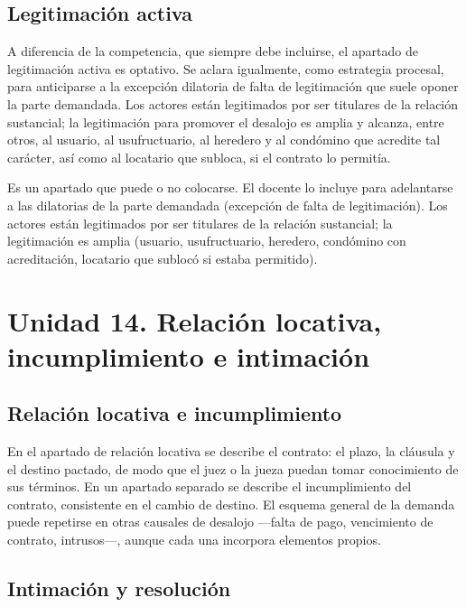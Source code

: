 \documentclass[12pt,oneside]{book}
\begin{document}
\subsection*{Legitimación activa}

A diferencia de la competencia, que siempre debe incluirse, el apartado de legitimación activa es optativo. Se aclara igualmente, como estrategia procesal, para anticiparse a la excepción dilatoria de falta de legitimación que suele oponer la parte demandada. Los actores están legitimados por ser titulares de la relación sustancial; la legitimación para promover el desalojo es amplia y alcanza, entre otros, al usuario, al usufructuario, al heredero y al condómino que acredite tal carácter, así como al locatario que subloca, si el contrato lo permitía.

\begin{important}
Es un apartado que puede o no colocarse. El docente lo incluye para adelantarse a las dilatorias de la parte demandada (excepción de falta de legitimación). Los actores están legitimados por ser titulares de la relación sustancial; la legitimación es amplia (usuario, usufructuario, heredero, condómino con acreditación, locatario que sublocó si estaba permitido).
\end{important}

\section*{Unidad 14. Relación locativa, incumplimiento e intimación}

\subsection*{Relación locativa e incumplimiento}

En el apartado de relación locativa se describe el contrato: el plazo, la cláusula y el destino pactado, de modo que el juez o la jueza puedan tomar conocimiento de sus términos. En un apartado separado se describe el incumplimiento del contrato, consistente en el cambio de destino. El esquema general de la demanda puede repetirse en otras causales de desalojo —falta de pago, vencimiento de contrato, intrusos—, aunque cada una incorpora elementos propios.

\subsection*{Intimación y resolución}
\end{document}
